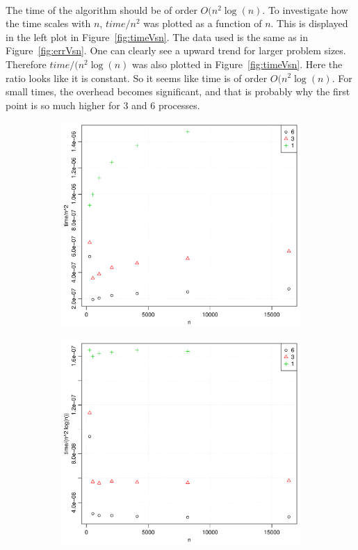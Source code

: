 %
\\
The time of the algorithm should be of order $O(n^2 \log(n)$. To investigate how the time scales with $n$, $time/n^2$ was plotted as a function of $n$. This is displayed in the left plot in Figure~\ref{fig:timeVsn}. The data used is the same as in Figure~\ref{fig:errVsn}. One can clearly see a upward trend for larger problem sizes. Therefore $time/(n^2 \log(n)$ was also plotted in Figure~\ref{fig:timeVsn}. Here the ratio looks like it is constant. So it seems like time is of order $O(n^2 \log(n)$. For small times, the overhead becomes significant, and that is probably why the first point is so much higher for 3 and 6 processes.
\begin{figure}[h!]
  \centering
  \begin{subfigure}[b]{0.48\textwidth}
    \includegraphics[width=\textwidth]{./Figures/timeOverN2Vsn.pdf}
  \end{subfigure}%
  \quad
  \begin{subfigure}[b]{0.48\textwidth}
    \includegraphics[width=\textwidth]{./Figures/timeOverN2LogNVsn.pdf}

\end{subfigure}
\end{figure}
